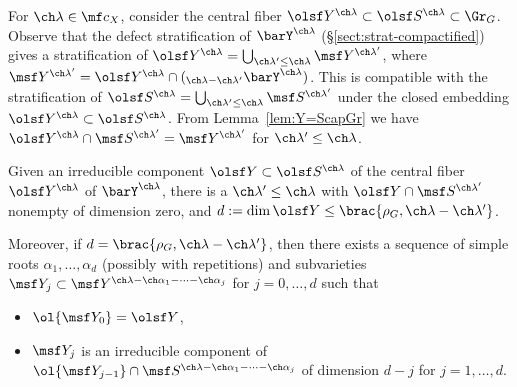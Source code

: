 For $\ch\lambda \in \mf c_X$, consider
the central fiber $\olsf Y^{\ch\lambda} \subset \olsf S^{\ch\lambda} \subset \Gr_G$.
Observe that the defect stratification of $\barY^{\ch\lambda}$ (\S \ref{sect:strat-compactified}) gives a stratification
of $\olsf Y^{\ch\lambda} = \bigcup_{\ch\lambda' \le \ch\lambda} \msf Y^{\ch\lambda'}$,
where $\msf Y^{\ch\lambda'} = \olsf Y^{\ch\lambda}\cap ({_{\ch\lambda-\ch\lambda'}} \barY^{\ch\lambda})$.
This is compatible with the stratification of $\olsf S^{\ch\lambda} = \bigcup_{\ch\lambda'\le\ch\lambda}
\msf S^{\ch\lambda'}$ under the closed embedding $\olsf Y^{\ch\lambda}\subset \olsf S^{\ch\lambda}$.
From Lemma~\ref{lem:Y=ScapGr} we have $\olsf Y^{\ch\lambda} \cap \msf S^{\ch\lambda'} = \msf Y^{\ch\lambda'}$
for $\ch\lambda' \le \ch\lambda$.


\begin{prop}
\notready
\label{prop:intersections}
 Given an irreducible component $\olsf Y \subset \olsf S^{\ch\lambda}$ of the central fiber $\olsf Y^{\ch\lambda}$ of $\barY^{\ch\lambda}$, there is a $\ch\lambda'\le \ch\lambda$ with $\olsf Y \cap \msf S^{\ch\lambda'}$ nonempty of dimension zero, and $d:=\dim \olsf Y \le \brac{ \rho_G, \ch\lambda-\ch\lambda'}$.

Moreover, if $d= \brac{ \rho_G, \ch\lambda-\ch\lambda'}$, then there exists a sequence of simple roots $\alpha_1, \dots,\alpha_d$ (possibly with repetitions)
and subvarieties $\msf Y_j \subset \msf Y^{\ch\lambda-\ch\alpha_1-\dotsb-\ch\alpha_j}$ for $j=0,\dotsc,d$  such that
\begin{itemize}
\item $\ol{\msf Y_0} = \olsf Y$,
\item $\msf Y_j$ is an irreducible component of $\ol{\msf Y_{j-1}} \cap \msf S^{\ch\lambda - \ch\alpha_1 - \cdots -\ch\alpha_j}$ of dimension $d-j$ for $j=1,\dotsc, d$.
\end{itemize}
\end{prop}

